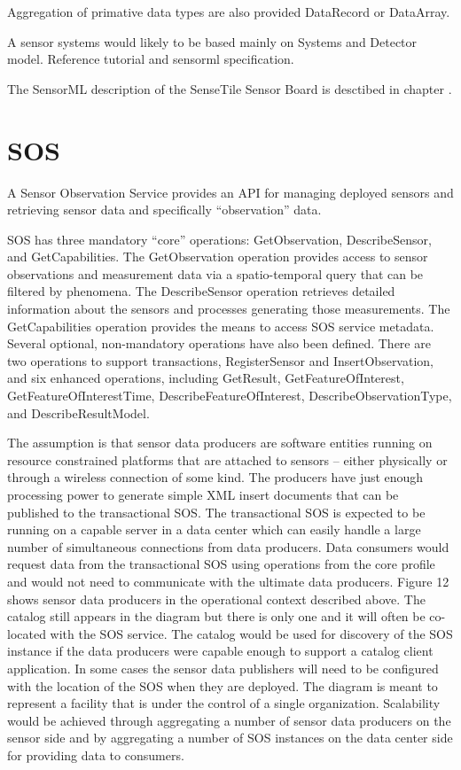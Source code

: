 \documentclass[]{final_report}
\begin{document}
Aggregation of primative data types are also provided DataRecord or DataArray.

A sensor systems would likely to be based mainly on Systems and
Detector model. Reference tutorial and sensorml specification.

The SensorML description of the SenseTile Sensor Board is desctibed in chapter .

\section{SOS}
A Sensor Observation Service provides an API for managing deployed sensors and
retrieving sensor data and specifically “observation” data.

SOS has three mandatory “core” operations: GetObservation, DescribeSensor, and
GetCapabilities. The GetObservation operation provides access to sensor observations
and measurement data via a spatio-temporal query that can be filtered by phenomena.
The DescribeSensor operation retrieves detailed information about the sensors and
processes generating those measurements. The GetCapabilities operation provides the
means to access SOS service metadata. Several optional, non-mandatory operations have
also been defined. There are two operations to support transactions, RegisterSensor and
InsertObservation, and six enhanced operations, including GetResult,
GetFeatureOfInterest, GetFeatureOfInterestTime, DescribeFeatureOfInterest,
DescribeObservationType, and DescribeResultModel.

The assumption is that sensor data producers are software entities running on resource
constrained platforms that are attached to sensors – either physically or through a
wireless connection of some kind. The producers have just enough processing power to
generate simple XML insert documents that can be published to the transactional SOS.
The transactional SOS is expected to be running on a capable server in a data center
which can easily handle a large number of simultaneous connections from data
producers.
Data consumers would request data from the transactional SOS using operations from the
core profile and would not need to communicate with the ultimate data producers. Figure
12 shows sensor data producers in the operational context described above. The catalog
still appears in the diagram but there is only one and it will often be co-located with the
SOS service. The catalog would be used for discovery of the SOS instance if the data
producers were capable enough to support a catalog client application. In some cases the
sensor data publishers will need to be configured with the location of the SOS when they
are deployed. The diagram is meant to represent a facility that is under the control of a
single organization. Scalability would be achieved through aggregating a number of
sensor data producers on the sensor side and by aggregating a number of SOS instances
on the data center side for providing data to consumers.
\end{document}
